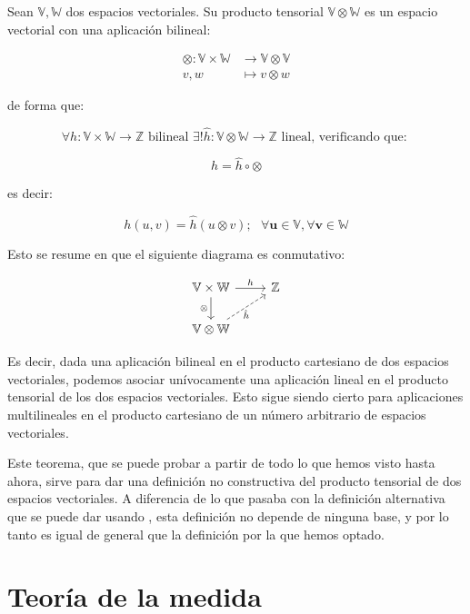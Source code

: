 \begin{teorema} Sean $\mathbb{V}, \mathbb{W}$ dos espacios vectoriales. Su producto tensorial $\mathbb{V} \otimes \mathbb{W}$ es un espacio vectorial con una aplicación bilineal:

\begin{equation}
\begin{split}
    \otimes : \mathbb{V} \times \mathbb{W} &\to \mathbb{V} \otimes \mathbb{V} \\
    v, w & \mapsto v \otimes w
\end{split}
\end{equation}

de forma que:

\begin{equation}
    \forall h: \mathbb{V} \times \mathbb{W} \to \mathbb{Z} \text{  bilineal  } \exists! \hat{h}: \mathbb{V} \otimes \mathbb{W} \to \mathbb{Z} \text{  lineal, verificando que: }
\end{equation}

\begin{equation}
    h = \hat{h} \circ \otimes
\end{equation}

es decir:

\begin{equation}
    h(u, v) = \hat{h}(u \otimes v); \text{   } \forall \mathbf{u} \in \mathbb{V}, \forall \mathbf{v} \in \mathbb{W}
\end{equation}

Esto se resume en que el siguiente diagrama es conmutativo:

\begin{equation}
\begin{tikzcd}
    \mathbb{V} \times \mathbb{W} \ar{r}{h} \ar{d}[left]{\otimes} & \mathbb{Z} \\
    \mathbb{V} \otimes \mathbb{W} \ar[dashed]{ur}[right, below]{\hat{h}}
\end{tikzcd}
\end{equation}


\end{teorema}

Es decir, dada una aplicación bilineal en el producto cartesiano de dos espacios vectoriales, podemos asociar unívocamente una aplicación lineal en el producto tensorial de los dos espacios vectoriales. Esto sigue siendo cierto para aplicaciones multilineales en el producto cartesiano de un número arbitrario de espacios vectoriales.

Este teorema, que se puede probar a partir de todo lo que hemos visto hasta ahora, sirve para dar una definición no constructiva del producto tensorial de dos espacios vectoriales. A diferencia de lo que pasaba con la definición alternativa que se puede dar usando , esta definición no depende de ninguna base, y por lo tanto es igual de general que la definición por la que hemos optado.

\newpage
\section{Teoría de la medida}

\endinput
